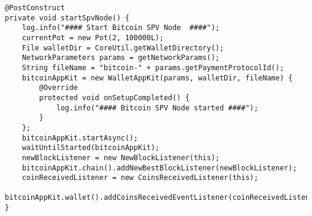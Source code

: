 \begin{lstlisting}[basicstyle=\small]
@PostConstruct
private void startSpvNode() {
    log.info("#### Start Bitcoin SPV Node  ####");
    currentPot = new Pot(2, 100000L);
    File walletDir = CoreUtil.getWalletDirectory();
    NetworkParameters params = getNetworkParams();
    String fileName = "bitcoin-" + params.getPaymentProtocolId();
    bitcoinAppKit = new WalletAppKit(params, walletDir, fileName) {
        @Override
        protected void onSetupCompleted() {
            log.info("#### Bitcoin SPV Node started ####");
        }
    };
    bitcoinAppKit.startAsync();
    waitUntilStarted(bitcoinAppKit);
    newBlockListener = new NewBlockListener(this);
    bitcoinAppKit.chain().addNewBestBlockListener(newBlockListener);
    coinReceivedListener = new CoinsReceivedListener(this);
    bitcoinAppKit.wallet().addCoinsReceivedEventListener(coinReceivedListener);
}
\end{lstlisting}

